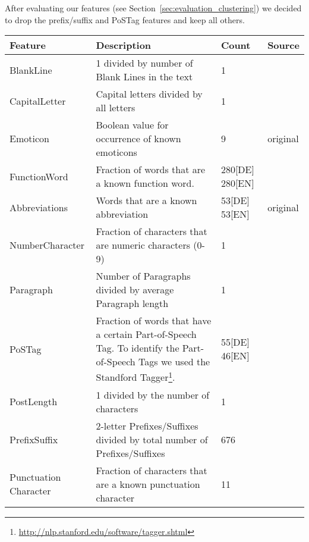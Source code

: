 After evaluating our features (see Section~\ref{sec:evaluation_clustering}) we decided to drop the prefix/suffix and PoSTag features and keep all others.

\begin{table}[h]
    \begin{center}
    \begin{tabular}{p{2.6cm}|p{6cm}|p{1.2cm}|p{1.2cm}}
    Feature					& Description																& Count				& Source\\ \hline \hline
    BlankLine				& 1 divided by number of Blank Lines in the text							& 1					& \cite{de2001mining}\\ \hline
    CapitalLetter			& Capital letters divided by all letters									& 1					& \cite{argamon2003style} \cite{de2001mining}\\ \hline
    Emoticon				& Boolean value for occurrence of known emoticons							& 9					& original\\ \hline
    FunctionWord			& Fraction of words that are a known function word.							& 280[DE] 280[EN]	& \cite{argamon2003style} \cite{de2001mining} \cite{madigan2005author} \cite{narayanan2012feasibility}\\ \hline
    Abbreviations			& Words that are a known abbreviation										& 53[DE] 53[EN]		& original\\ \hline
    NumberCharacter			& Fraction of characters that are numeric characters (0-9)					& 1					& \cite{narayanan2012feasibility}\\ \hline
    Paragraph				& Number of Paragraphs divided by average Paragraph	length					& 1					& \cite{argamon2003style}\\ \hline
    PoSTag					& Fraction of words that have a certain Part-of-Speech Tag. To identify the Part-of-Speech Tags we used the Standford Tagger\footnote{\url{http://nlp.stanford.edu/software/tagger.shtml}}.
                                                                                                        & 55[DE] 46[EN]  	& \cite{madigan2005author}\\ \hline
    PostLength				& 1 divided by the number of characters										& 1					& \cite{narayanan2012feasibility}\\ \hline
    PrefixSuffix			& 2-letter Prefixes/Suffixes divided by total number of Prefixes/Suffixes	& 676 			 	& \cite{madigan2005author}\\ \hline
    Punctuation Character	& Fraction of characters that are a known punctuation character				& 11				& \cite{madigan2005author} \cite{narayanan2012feasibility}\\ \hline

\end{tabular}
\end{center}
\end{table}

